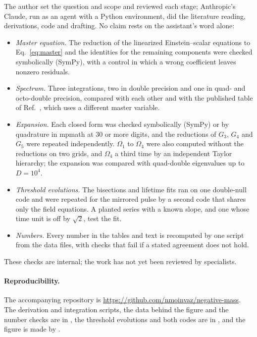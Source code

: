 \documentclass[11pt]{article}
\theoremstyle{remark}
\begin{document}
The author set the question and scope and reviewed each stage; Anthropic's Claude, run as an agent with a Python
environment, did the literature reading, derivations, code and drafting. No claim rests on the assistant's word alone:
\begin{itemize}
\item \emph{Master equation.} The reduction of the linearized Einstein--scalar equations to Eq.~\eqref{eq:master} and
the identities for the remaining components were checked symbolically (SymPy), with a control in which a wrong
coefficient leaves nonzero residuals.
\item \emph{Spectrum.} Three integrations, two in double precision and one in quad- and octo-double precision,
compared with each other and with the published table of Ref.~\cite{TS2013}, which uses a different master variable.
\item \emph{Expansion.} Each closed form was checked symbolically (SymPy) or by quadrature in mpmath at 30 or more
digits, and the reductions of $G_3$, $G_4$ and $G_5$ were repeated independently. $\Omega_1$ to $\Omega_4$ were
also computed without the reductions on two grids, and $\Omega_4$ a third time by an independent Taylor hierarchy; the expansion was compared with quad-double eigenvalues up to
$D=10^4$.
\item \emph{Threshold evolutions.} The bisections and lifetime fits ran on one double-null code and were repeated for the
mirrored pulse by a second code that shares only the field equations. A planted series with a known slope, and one whose
time unit is off by $\sqrt2$, test the fit.
\item \emph{Numbers.} Every number in the tables and text is recomputed by one script from the data files, with
checks that fail if a stated agreement does not hold.
\end{itemize}
These checks are internal; the work has not yet been reviewed by specialists.

\paragraph{Reproducibility.} The accompanying repository is \url{https://github.com/nmoinvaz/negative-mass}. The
derivation and integration scripts, the data behind the figure and the number checks are in
, the threshold evolutions and both codes are in ,
and the figure is made by .
\end{document}
